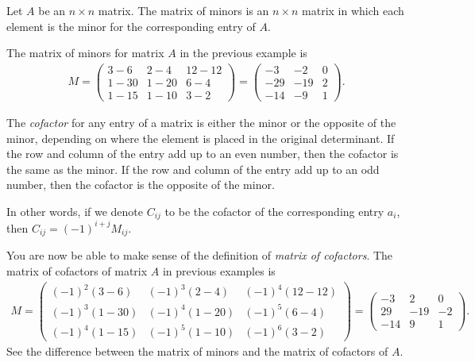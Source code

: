 \documentclass{subfile}
\begin{document}
	\begin{definition}
		Let $A$ be an $n\times n$ matrix. The matrix of minors is an $n\times n$ matrix in which each element is the minor for the corresponding entry of $A$.
	\end{definition}
	
	\begin{example}
		The matrix of minors for matrix $A$ in the previous example is
		\begin{align*}
			M= \begin{pmatrix}
			3-6&2-4&12-12\\1-30&1-20&6-4\\1-15&1-10&3-2
			\end{pmatrix}
			= \begin{pmatrix}
			-3&-2&0\\-29&-19&2\\-14&-9&1
			\end{pmatrix}.
		\end{align*}
	\end{example}
	
	\begin{definition}[Cofactor]
		The \textit{cofactor} for any entry of a matrix is either the minor or the opposite of the minor, depending on where the element is placed in the original determinant. If the row and column of the entry add up to an even number, then the cofactor is the same as the minor. If the row and column of the entry add up to an odd number, then the cofactor is the opposite of the minor.
		
		In other words, if we denote $C_{ij}$ to be the cofactor of the corresponding entry $a_{i}$, then $C_{ij}=(-1)^{i+j} M_{ij}$.
	\end{definition}
	
	\begin{example}
		You are now be able to make sense of the definition of \textit{matrix of cofactors}. The matrix of cofactors of matrix $A$ in previous examples is
			\begin{align*}
			M= \begin{pmatrix}
			(-1)^{2}(3-6)&(-1)^{3}(2-4)&(-1)^{4}(12-12)\\ (-1)^{3}(1-30)&(-1)^{4}(1-20)&(-1)^{5}(6-4)\\ (-1)^{4}(1-15)&(-1)^{5}(1-10)&(-1)^{6}(3-2)
			\end{pmatrix}
			= \begin{pmatrix}
			-3&2&0\\29&-19&-2\\-14&9&1
			\end{pmatrix}.
			\end{align*}
		See the difference between the matrix of minors and the matrix of cofactors of $A$. 
	\end{example}
	
\end{document}
